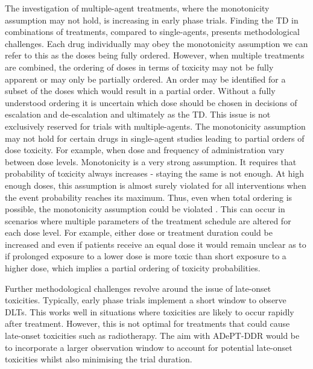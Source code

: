 The investigation of multiple-agent treatments, where the monotonicity assumption may not hold, is increasing in early phase trials. Finding the TD in combinations of treatments, compared to single-agents,  presents methodological challenges. Each drug individually may obey the monotonicity assumption we can refer to this as the doses being fully ordered. However, when multiple treatments are combined, the ordering of doses in terms of toxicity may not be fully apparent or may only be partially ordered. An order may be identified for a subset of the doses which would result in a partial order. Without a fully understood ordering it is uncertain which dose should be chosen in decisions of escalation and de-escalation and ultimately as the TD. This issue is not exclusively reserved for trials with multiple-agents. The monotonicity assumption may not hold for certain drugs in single-agent studies leading to partial orders of dose toxicity. For example, when dose and frequency of administration vary between dose levels. Monotonicity is a very strong assumption. It requires that probability of toxicity always increases - staying the same is not enough. At high enough doses, this assumption is almost surely violated for all interventions when the event probability reaches its maximum. Thus, even when total ordering is possible, the monotonicity assumption could be violated \cite{brockMoreBetterAnalysis2021}. This can occur in scenarios where multiple parameters of the treatment schedule are altered for each dose level. For example, either dose or treatment duration could be increased and even if patients receive an equal dose it would remain unclear as to if prolonged exposure to a lower dose is more toxic than short exposure to a higher dose, which implies a partial ordering of toxicity probabilities. 

Further methodological challenges revolve around the issue of late-onset toxicities. Typically, early phase trials implement a short window to observe DLTs. This works well in situations where toxicities are likely to occur rapidly after treatment. However, this is not optimal for treatments that could cause late-onset toxicities such as radiotherapy. The aim with ADePT-DDR would be to incorporate a larger observation window to account for potential late-onset toxicities whilst also minimising the trial duration. 

